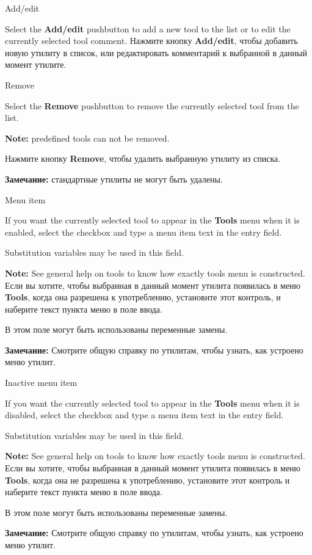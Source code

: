 \begin{popup}
\caption{Add/edit}

\ifenglish
Select the {\bf Add/edit} pushbutton to add a new tool to the list or
to edit the currently selected tool comment.
 \else
Нажмите кнопку {\bf Add/edit}, чтобы добавить новую утилиту в список, или 
редактировать комментарий к выбранной в данный момент утилите.
\fi
\end{popup}

\begin{popup}
\caption{Remove}

\ifenglish
Select the {\bf Remove} pushbutton to remove the currently selected
tool from the list.

{\bf Note:} predefined tools can not be removed.

 \else
Нажмите кнопку {\bf Remove}, чтобы удалить выбранную утилиту из списка.

{\bf Замечание:} стандартные утилиты не могут быть удалены.
\fi
\end{popup}

\begin{popup}
\caption{Menu item}

\ifenglish
If you want the currently selected tool to appear in the {\bf Tools}
menu when it is enabled, select the checkbox and type a menu item text in the entry field.

Substitution variables may be used in this field.

{\bf Note:} See general help on tools to know how exactly tools menu is 
constructed.
 \else
Если вы хотите, чтобы выбранная в данный момент утилита появилась в меню 
{\bf Tools}, когда она разрешена к употреблению, установите этот контроль, 
и наберите текст пункта меню в поле ввода.

В этом поле могут быть использованы переменные замены.

{\bf Замечание:} Смотрите общую справку по утилитам, чтобы узнать, как устроено 
меню утилит.
\fi
\end{popup}

\begin{popup}
\caption{Inactive menu item}

\ifenglish
If you want the currently selected tool to appear in the {\bf Tools}
menu when it is disabled, select the checkbox and type a menu item text in the entry field.

Substitution variables may be used in this field.

{\bf Note:} See general help on tools to know how exactly tools menu is 
constructed.
 \else
Если вы хотите, чтобы выбранная в данный момент утилита появилась в меню 
{\bf Tools}, когда она не разрешена к употреблению, установите этот контроль 
и наберите текст пункта меню в поле ввода.

В этом поле могут быть использованы переменные замены.

{\bf Замечание:} Смотрите общую справку по утилитам, чтобы узнать, как устроено 
меню утилит.
\fi
\end{popup}


